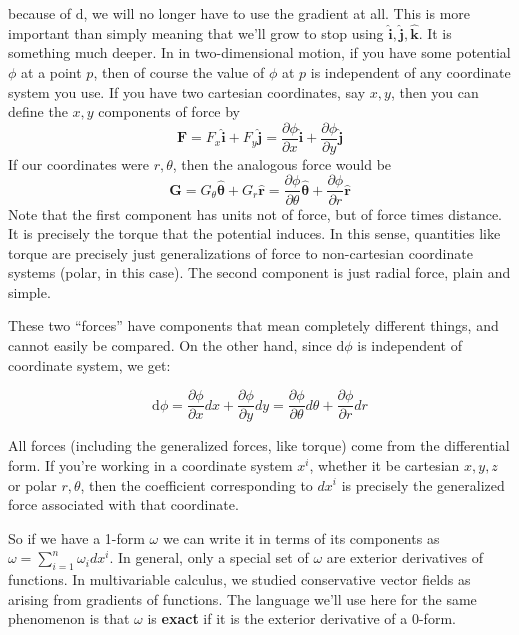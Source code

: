 \documentclass[../master.tex]{subfiles}
\begin{document}
	because of $\mathrm d$, we will no longer have to use the gradient at all. This is more important than simply meaning that we'll grow to stop using $\mathbf{\hat i}, \mathbf{\hat j},\mathbf{\hat k}$. It is something much deeper. In in two-dimensional motion, if you have some potential $\phi$ at a point $p$, then of course the value of $\phi$ at $p$ is independent of any coordinate system you use. If you have two cartesian coordinates, say $x,y$, then you can define the $x,y$ components of force by 
	\begin{equation*}
		\mathbf{F} = F_x \mathbf{\hat i} + F_y \mathbf{\hat j} = \frac{\partial \phi}{\partial x} \mathbf{\hat i} + \frac{\partial \phi}{\partial y} \mathbf{\hat j}
	\end{equation*}
	If our coordinates were $r,\theta$, then the analogous force would be
	\begin{equation*}
		\mathbf{G} = G_\theta \mathbf{\hat \theta} + G_r \mathbf{\hat r} = \frac{\partial \phi}{\partial \theta} \mathbf{\hat \theta} + \frac{\partial \phi}{\partial r} \mathbf{\hat r}
	\end{equation*}
	Note that the first component has units not of force, but of force times distance. It is precisely the torque that the potential induces. In this sense, quantities like torque are precisely just generalizations of force to non-cartesian coordinate systems (polar, in this case). The second component is just radial force, plain and simple.
	
	These two ``forces'' have components that mean completely different things, and cannot easily be compared. On the other hand, since $\mathrm d \phi$ is independent of coordinate system, we get:
	
	\begin{equation}
		\mathrm d \phi = \frac{\partial \phi}{\partial x} dx + \frac{\partial \phi}{\partial y} dy = \frac{\partial \phi}{\partial \theta} d\theta + \frac{\partial \phi}{\partial r} dr 
	\end{equation}
	
	All forces (including the generalized forces, like torque) come from the differential form. If you're working in a coordinate system $x^i$, whether it be cartesian $x,y,z$ or polar $r, \theta$, then the coefficient corresponding to $dx^i$ is precisely the generalized force associated with that coordinate.
	
	So if we have a 1-form $\omega$ we can write it in terms of its components as $\omega = \sum_{i=1}^n \omega_i dx^i$. In general, only a special set of $\omega$ are exterior derivatives of functions. In multivariable calculus, we studied conservative vector fields as arising from gradients of functions. The language we'll use here for the same phenomenon is that $\omega$ is \textbf{exact}  if it is the exterior derivative of a 0-form.
	
\end{document}
